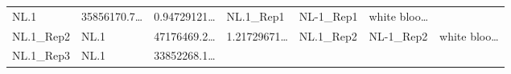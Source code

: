 \documentclass[
]{article}
\begin{document}
\begin{longtable}[]{@{}lllllll@{}}
\begin{minipage}[t]{0.07\columnwidth}
NL.1\strut
\end{minipage} & \begin{minipage}[t]{0.13\columnwidth}\raggedright
35856170.7\ldots{}\strut
\end{minipage} & \begin{minipage}[t]{0.13\columnwidth}\raggedright
0.94729121\ldots{}\strut
\end{minipage} & \begin{minipage}[t]{0.12\columnwidth}\raggedright
NL.1\_Rep1\strut
\end{minipage} & \begin{minipage}[t]{0.12\columnwidth}\raggedright
NL-1\_Rep1\strut
\end{minipage} & \begin{minipage}[t]{0.13\columnwidth}\raggedright
white bloo\ldots{}\strut
\end{minipage}\tabularnewline
\begin{minipage}[t]{0.12\columnwidth}\raggedright
NL.1\_Rep2\strut
\end{minipage} & \begin{minipage}[t]{0.07\columnwidth}\raggedright
NL.1\strut
\end{minipage} & \begin{minipage}[t]{0.13\columnwidth}\raggedright
47176469.2\ldots{}\strut
\end{minipage} & \begin{minipage}[t]{0.13\columnwidth}\raggedright
1.21729671\ldots{}\strut
\end{minipage} & \begin{minipage}[t]{0.12\columnwidth}\raggedright
NL.1\_Rep2\strut
\end{minipage} & \begin{minipage}[t]{0.12\columnwidth}\raggedright
NL-1\_Rep2\strut
\end{minipage} & \begin{minipage}[t]{0.13\columnwidth}\raggedright
white bloo\ldots{}\strut
\end{minipage}\tabularnewline
\begin{minipage}[t]{0.12\columnwidth}\raggedright
NL.1\_Rep3\strut
\end{minipage} & \begin{minipage}[t]{0.07\columnwidth}\raggedright
NL.1\strut
\end{minipage} & \begin{minipage}[t]{0.13\columnwidth}\raggedright
33852268.1\ldots{}\strut
\end{minipage} & \begin{minipage}[t]{0.13\columnwidth}\raggedright

\end{minipage}
\end{longtable}
\end{document}

